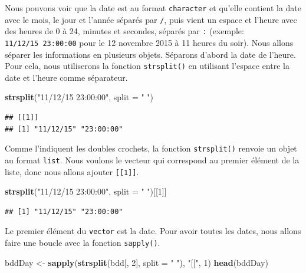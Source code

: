 \documentclass[]{book}
\newenvironment{Shaded}{\begin{snugshade}}{\end{snugshade}}
\newcommand{\DataTypeTok}[1]{\textcolor[rgb]{0.13,0.29,0.53}{#1}}
\newcommand{\DecValTok}[1]{\textcolor[rgb]{0.00,0.00,0.81}{#1}}
\newcommand{\KeywordTok}[1]{\textcolor[rgb]{0.13,0.29,0.53}{\textbf{#1}}}
\newcommand{\NormalTok}[1]{#1}
\newcommand{\StringTok}[1]{\textcolor[rgb]{0.31,0.60,0.02}{#1}}
\begin{document}
Nous pouvons voir que la date est au format \texttt{character} et qu'elle contient la date avec le mois, le jour et l'année séparés par \texttt{/}, puis vient un espace et l'heure avec des heures de 0 à 24, minutes et secondes, séparés par \texttt{:} (exemple: \texttt{11/12/15\ 23:00:00} pour le 12 novembre 2015 à 11 heures du soir). Nous allons séparer les informations en plusieurs objets. Séparons d'abord la date de l'heure. Pour cela, nous utiliserons la fonction \texttt{strsplit()} en utilisant l'espace entre la date et l'heure comme séparateur.

\begin{Shaded}
\begin{Highlighting}[]
\KeywordTok{strsplit}\NormalTok{(}\StringTok{"11/12/15 23:00:00"}\NormalTok{, }\DataTypeTok{split =} \StringTok{" "}\NormalTok{)}
\end{Highlighting}
\end{Shaded}

\begin{verbatim}
## [[1]]
## [1] "11/12/15" "23:00:00"
\end{verbatim}

Comme l'indiquent les doubles crochets, la fonction \texttt{strsplit()} renvoie un objet au format \texttt{list}. Nous voulons le vecteur qui correspond au premier élément de la liste, donc nous allons ajouter \texttt{{[}{[}1{]}{]}}.

\begin{Shaded}
\begin{Highlighting}[]
\KeywordTok{strsplit}\NormalTok{(}\StringTok{"11/12/15 23:00:00"}\NormalTok{, }\DataTypeTok{split =} \StringTok{" "}\NormalTok{)[[}\DecValTok{1}\NormalTok{]]}
\end{Highlighting}
\end{Shaded}

\begin{verbatim}
## [1] "11/12/15" "23:00:00"
\end{verbatim}

Le premier élément du \texttt{vector} est la date. Pour avoir toutes les dates, nous allons faire une boucle avec la fonction \texttt{sapply()}.

\begin{Shaded}
\begin{Highlighting}[]
\NormalTok{bddDay <-}\StringTok{ }\KeywordTok{sapply}\NormalTok{(}\KeywordTok{strsplit}\NormalTok{(bdd[, }\DecValTok{2}\NormalTok{], }\DataTypeTok{split =} \StringTok{" "}\NormalTok{), }\StringTok{"[["}\NormalTok{, }\DecValTok{1}\NormalTok{)}
\KeywordTok{head}\NormalTok{(bddDay)}
\end{Highlighting}
\end{Shaded}
\end{document}
